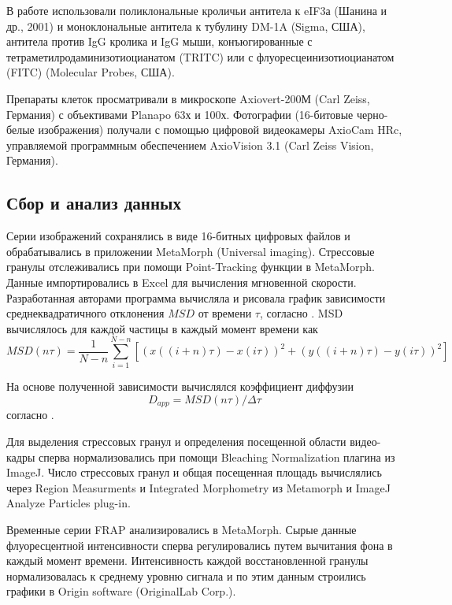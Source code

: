 \documentclass[14pt,a4paper]{extarticle}
\begin{document}
	В работе использовали поликлональные кроличьи антитела к eIF3а (Шанина и др., 2001) и моноклональные антитела к тубулину DM-1A (Sigma, США), антитела против IgG кролика и IgG мыши, конъюгированные с тетраметилродаминизотиоцианатом (TRITC) или с флуоресцеинизотиоцианатом (FITC) (Molecular Probes, США).

	Препараты клеток просматривали в микроскопе Axiovert-200М (Carl Zeiss, Германия) с объективами Planapo 63х и 100х. Фотографии (16-битовые черно- белые изображения) получали с помощью цифровой видеокамеры AxioCam HRc, управляемой программным обеспечением AxioVision 3.1 (Carl Zeiss Vision, Германия).


\subsection{Сбор и анализ данных}
	Серии изображений сохранялись в виде 16-битных цифровых файлов и обрабатывались в приложении MetaMorph (Universal imaging). Стрессовые гранулы отслеживались при помощи Point-Tracking функции в MetaMorph. Данные импортировались в Excel для вычисления мгновенной скорости. Разработанная авторами программа вычисляла и рисовала график зависимости среднеквадратичного отклонения $MSD$ от времени $\tau$, согласно \cite{Saxton:1993uq}.
MSD вычислялось для каждой частицы в каждый момент времени как
$$
MSD(n \tau) = \frac{1}{N - n} \sum_{i=1}^{N - n}
[(x((i+n)\tau) - x(i\tau))^2 + (y((i+n)\tau) - y(i\tau))^2]
$$

На основе полученной зависимости вычислялся коэффициент диффузии
$$
D_{app} = MSD(n\tau) / \Delta \tau
$$
согласно \cite{Heinzer:2008fk}.

	Для выделения стрессовых гранул и определения посещенной области видео-кадры сперва нормализовались при помощи Bleaching Normalization плагина из ImageJ. Число стрессовых гранул и общая посещенная площадь вычислялись через Region Measurments и Integrated Morphometry из Metamorph и ImageJ Analyze Particles plug-in.

	Временные серии FRAP анализировались в MetaMorph. Сырые данные флуоресцентной интенсивности сперва регулировались путем вычитания фона в каждый момент времени. Интенсивность каждой восстановленной гранулы нормализовалась к среднему уровню сигнала и по этим данным строились графики в Origin software (OriginalLab Corp.).
\end{document}
